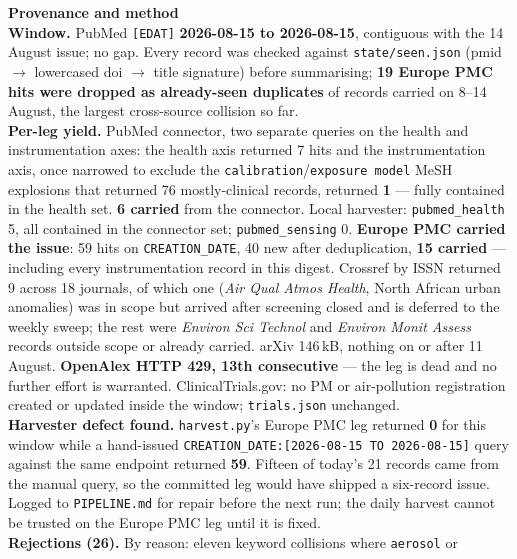 \documentclass[10pt]{article}
\begin{document}
\vspace{4mm}
\begin{keybox}
{\sffamily\bfseries\footnotesize\color{Deep}Provenance and method}\\[1.2mm]
{\fontsize{7.2}{8.8}\selectfont
\textbf{Window.} PubMed \texttt{[EDAT]} \textbf{2026-08-15 to 2026-08-15}, contiguous with
the 14 August issue; no gap. Every record was checked against \texttt{state/seen.json}
(pmid $\rightarrow$ lowercased doi $\rightarrow$ title signature) before summarising;
\textbf{19 Europe PMC hits were dropped as already-seen duplicates} of records carried on
8--14 August, the largest cross-source collision so far.\\[0.8mm]
\textbf{Per-leg yield.} PubMed connector, two separate queries on the health and
instrumentation axes: the health axis returned 7 hits and the instrumentation axis, once
narrowed to exclude the \texttt{calibration}/\texttt{exposure model} MeSH explosions that
returned 76 mostly-clinical records, returned \textbf{1} --- fully contained in the health
set. \textbf{6 carried} from the connector. Local harvester: \texttt{pubmed\_health} 5, all
contained in the connector set; \texttt{pubmed\_sensing} 0. \textbf{Europe PMC carried the
issue}: 59 hits on \texttt{CREATION\_DATE}, 40 new after deduplication, \textbf{15 carried}
--- including every instrumentation record in this digest. Crossref by ISSN returned 9
across 18 journals, of which one (\textit{Air Qual Atmos Health}, North African urban
anomalies) was in scope but arrived after screening closed and is deferred to the weekly
sweep; the rest were \textit{Environ Sci Technol} and \textit{Environ Monit Assess} records
outside scope or already carried. arXiv 146\,kB, nothing on or after 11 August.
\textbf{OpenAlex HTTP 429, 13th consecutive} --- the leg is dead and no further effort is
warranted. ClinicalTrials.gov: no PM or air-pollution registration created or updated inside
the window; \texttt{trials.json} unchanged.\\[0.8mm]
\textbf{Harvester defect found.} \texttt{harvest.py}'s Europe PMC leg returned \textbf{0}
for this window while a hand-issued \texttt{CREATION\_DATE:[2026-08-15 TO 2026-08-15]}
query against the same endpoint returned \textbf{59}. Fifteen of today's 21 records came
from the manual query, so the committed leg would have shipped a six-record issue. Logged
to \texttt{PIPELINE.md} for repair before the next run; the daily harvest cannot be trusted
on the Europe PMC leg until it is fixed.\\[0.8mm]
\textbf{Rejections (26).} By reason: eleven keyword collisions where \texttt{aerosol} or
}
\end{keybox}
\end{document}
